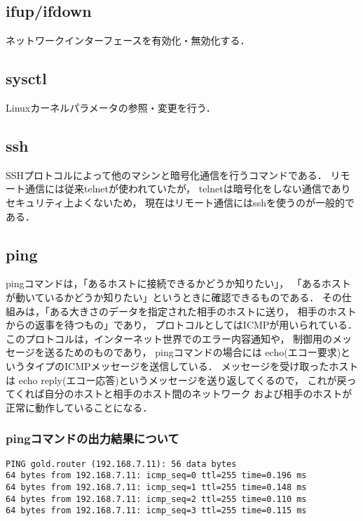 \documentclass[10pt,a4paper]{jarticle}
\begin{document}
\subsection{ifup/ifdown}
ネットワークインターフェースを有効化・無効化する．

\subsection{sysctl}
Linuxカーネルパラメータの参照・変更を行う．

\subsection{ssh}
SSHプロトコルによって他のマシンと暗号化通信を行うコマンドである．
リモート通信には従来telnetが使われていたが，
telnetは暗号化をしない通信でありセキュリティ上よくないため，
現在はリモート通信にはsshを使うのが一般的である．

\subsection{ping}
pingコマンドは，「あるホストに接続できるかどうか知りたい」，
「あるホストが動いているかどうか知りたい」というときに確認できるものである．
その仕組みは，「ある大きさのデータを指定された相手のホストに送り，
相手のホストからの返事を待つもの」であり，
プロトコルとしてはICMPが用いられている．
このプロトコルは，インターネット世界でのエラー内容通知や，
制御用のメッセージを送るためのものであり，
pingコマンドの場合には
echo(エコー要求)というタイプのICMPメッセージを送信している．
メッセージを受け取ったホストは
echo reply(エコー応答)というメッセージを送り返してくるので，
これが戻ってくれば自分のホストと相手のホスト間のネットワーク
および相手のホストが正常に動作していることになる．

\vspace{-6mm}
\subsubsection{pingコマンドの出力結果について}
\begin{screen}
\begin{verbatim}
PING gold.router (192.168.7.11): 56 data bytes
64 bytes from 192.168.7.11: icmp_seq=0 ttl=255 time=0.196 ms	
64 bytes from 192.168.7.11: icmp_seq=1 ttl=255 time=0.148 ms
64 bytes from 192.168.7.11: icmp_seq=2 ttl=255 time=0.110 ms
64 bytes from 192.168.7.11: icmp_seq=3 ttl=255 time=0.115 ms
\end{verbatim}
\end{screen}
\end{document}
